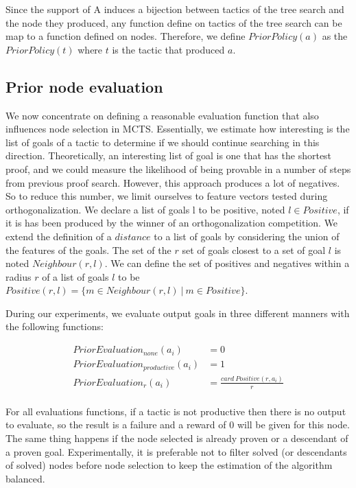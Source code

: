 \documentclass[runningheads,a4paper,draft]{svjour3}
\begin{document}
Since the support of A induces a bijection between tactics of the tree 
search and the node they 
produced, any function define on tactics of the tree search can be map to a 
function defined on nodes. 
Therefore, we define $PriorPolicy(a)$ as the $PriorPolicy(t)$ where $t$ is the 
tactic that produced $a$.

\subsection{Prior node evaluation}

We now concentrate on defining a reasonable evaluation function that also 
influences node selection in MCTS. Essentially, we estimate how 
interesting is the list of goals of a tactic to determine if we should continue 
searching in this direction. Theoretically, an interesting list of goal is one 
that has the shortest proof, and we could measure the likelihood of being 
provable in a number of steps from previous proof search. However, this 
approach produces a lot of negatives. So to reduce this number, we limit 
ourselves to feature vectors tested during orthogonalization. We declare a list 
of goals l to be positive, noted $l \in Positive$, if it is has been 
produced by the winner of an orthogonalization competition. We extend the 
definition of a $distance$ to a list of goals by considering the union of the 
features of the goals. The set of the $r$ set of goals closest to a set of 
goal $l$ is noted $Neighbour(r,l)$. We can define the set of positives and 
negatives within a radius $r$ of a 
list of goals $l$ to be $Positive(r,l) = \lbrace m \in Neighbour(r,l)\ |\ m \in 
Positive \rbrace$.

During our experiments, we evaluate output goals in three different manners 
with the following functions:

\begin{align*}
PriorEvaluation_{none} (a_i) &= 0 \\
PriorEvaluation_{productive} (a_i) &= 1\\
PriorEvaluation_r (a_i) &= \frac{card\ Positive(r,a_i)}{r}\\
\end{align*}

For all evaluations functions, if a tactic is not productive then there is no 
output to evaluate, so the result is a failure and a reward of $0$ will be 
given for this node. The same thing happens if the node selected is already 
proven or a descendant of a proven goal. 
Experimentally, it is preferable not to 
filter solved (or descendants of solved) nodes before 
node selection to keep the estimation of the algorithm balanced.
\end{document}
